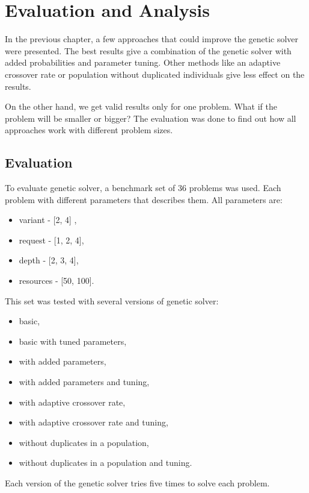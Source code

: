 \chapter{Evaluation and Analysis}

In the previous chapter, a few approaches that could improve the genetic solver were presented.
The best results give a combination of the genetic solver with added probabilities and parameter tuning.
Other methods like an adaptive crossover rate or population without duplicated individuals give less effect on the results.

On the other hand, we get valid results only for one problem. What if the problem will be smaller or bigger?
The evaluation was done to find out how all approaches work with different problem sizes. 

\section{Evaluation}

To evaluate genetic solver, a benchmark set of 36 problems was used.
Each problem with different parameters that describes them.
All parameters are:

\begin{itemize}
	\item variant - [2, 4] ,
	\item request - [1, 2, 4],
	\item depth - [2, 3, 4],
	\item resources - [50, 100].
\end{itemize}

This set was tested with several versions of genetic solver:

\begin{itemize}
	\item basic,
	\item basic with tuned parameters,
	\item with added parameters,
	\item with added parameters and tuning,
	\item with adaptive crossover rate,
	\item with adaptive crossover rate and tuning,
	\item without duplicates in a population,
	\item without duplicates in a population and tuning.
\end{itemize}

Each version of the genetic solver tries five times to solve each problem.

